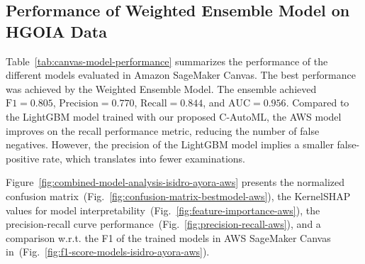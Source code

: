 \documentclass[diagnostics,article,submit,pdftex,moreauthors]{Definitions/mdpi}
\begin{document}
\subsection{Performance of Weighted Ensemble Model on \ac{HGOIA} Data}
\label{sec:performance-aws-sage-maker-canvas}

Table~\ref{tab:canvas-model-performance} summarizes the performance of
the different models evaluated in Amazon SageMaker Canvas. The best
performance was achieved by the Weighted Ensemble Model.
 The ensemble achieved
$\mathrm{F1}=0.805$, $\mathrm{Precision}=0.770$, $\mathrm{Recall}=0.844$, and
$\mathrm{AUC}=0.956$. Compared to the LightGBM model trained with
our proposed \ac{C-AutoML}, the AWS model improves on the recall
performance metric, reducing the number of false negatives. However,
the precision of the LightGBM model implies a smaller
false-positive rate, which translates into fewer examinations.

Figure~\ref{fig:combined-model-analysis-isidro-ayora-aws} presents
the normalized confusion
matrix~(Fig.~\ref{fig:confusion-matrix-bestmodel-aws}), the KernelSHAP values
for model interpretability~(Fig.~\ref{fig:feature-importance-aws}), the
precision-recall curve performance~(Fig.~\ref{fig:precision-recall-aws}), and
a comparison \ac{w.r.t.} the \ac{F1} of the trained models in AWS
SageMaker Canvas in~(Fig.~\ref{fig:f1-score-models-isidro-ayora-aws}).

\end{document}
